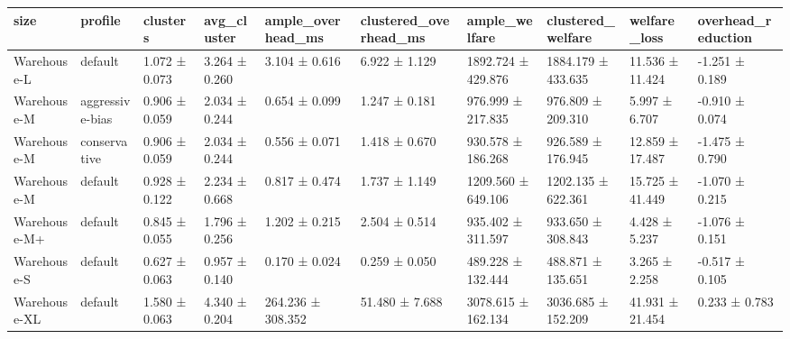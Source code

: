 \begin{tabular}{llllllllll}
\toprule
size & profile & clusters & avg\_cluster & ample\_overhead\_ms & clustered\_overhead\_ms & ample\_welfare & clustered\_welfare & welfare\_loss & overhead\_reduction \\
\midrule
Warehouse-L & default & 1.072 ± 0.073 & 3.264 ± 0.260 & 3.104 ± 0.616 & 6.922 ± 1.129 & 1892.724 ± 429.876 & 1884.179 ± 433.635 & 11.536 ± 11.424 & -1.251 ± 0.189 \\
Warehouse-M & aggressive-bias & 0.906 ± 0.059 & 2.034 ± 0.244 & 0.654 ± 0.099 & 1.247 ± 0.181 & 976.999 ± 217.835 & 976.809 ± 209.310 & 5.997 ± 6.707 & -0.910 ± 0.074 \\
Warehouse-M & conservative & 0.906 ± 0.059 & 2.034 ± 0.244 & 0.556 ± 0.071 & 1.418 ± 0.670 & 930.578 ± 186.268 & 926.589 ± 176.945 & 12.859 ± 17.487 & -1.475 ± 0.790 \\
Warehouse-M & default & 0.928 ± 0.122 & 2.234 ± 0.668 & 0.817 ± 0.474 & 1.737 ± 1.149 & 1209.560 ± 649.106 & 1202.135 ± 622.361 & 15.725 ± 41.449 & -1.070 ± 0.215 \\
Warehouse-M+ & default & 0.845 ± 0.055 & 1.796 ± 0.256 & 1.202 ± 0.215 & 2.504 ± 0.514 & 935.402 ± 311.597 & 933.650 ± 308.843 & 4.428 ± 5.237 & -1.076 ± 0.151 \\
Warehouse-S & default & 0.627 ± 0.063 & 0.957 ± 0.140 & 0.170 ± 0.024 & 0.259 ± 0.050 & 489.228 ± 132.444 & 488.871 ± 135.651 & 3.265 ± 2.258 & -0.517 ± 0.105 \\
Warehouse-XL & default & 1.580 ± 0.063 & 4.340 ± 0.204 & 264.236 ± 308.352 & 51.480 ± 7.688 & 3078.615 ± 162.134 & 3036.685 ± 152.209 & 41.931 ± 21.454 & 0.233 ± 0.783 \\
\bottomrule
\end{tabular}
